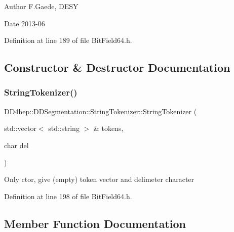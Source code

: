 \begin{DoxyAuthor}{Author}
F.\+Gaede, D\+E\+SY 
\end{DoxyAuthor}
\begin{DoxyDate}{Date}
2013-\/06 
\end{DoxyDate}


Definition at line 189 of file Bit\+Field64.\+h.



\subsection{Constructor \& Destructor Documentation}
\hypertarget{class_d_d4hep_1_1_d_d_segmentation_1_1_string_tokenizer_aae9366c4f1ddf75a606c77af83970f8c}{}\label{class_d_d4hep_1_1_d_d_segmentation_1_1_string_tokenizer_aae9366c4f1ddf75a606c77af83970f8c} 
\subsubsection{\texorpdfstring{String\+Tokenizer()}{StringTokenizer()}}
{\footnotesize\ttfamily D\+D4hep\+::\+D\+D\+Segmentation\+::\+String\+Tokenizer\+::\+String\+Tokenizer (\begin{DoxyParamCaption}\item[{std\+::vector$<$ std\+::string $>$ \&}]{tokens,  }\item[{char}]{del }\end{DoxyParamCaption})\hspace{0.3cm}{\ttfamily [inline]}}

Only c\textquotesingle{}tor, give (empty) token vector and delimeter character 

Definition at line 198 of file Bit\+Field64.\+h.



\subsection{Member Function Documentation}
\hypertarget{class_d_d4hep_1_1_d_d_segmentation_1_1_string_tokenizer_a9a7f740ffc721446c786bd7aed987a4b}{}\label{class_d_d4hep_1_1_d_d_segmentation_1_1_string_tokenizer_a9a7f740ffc721446c786bd7aed987a4b} 
